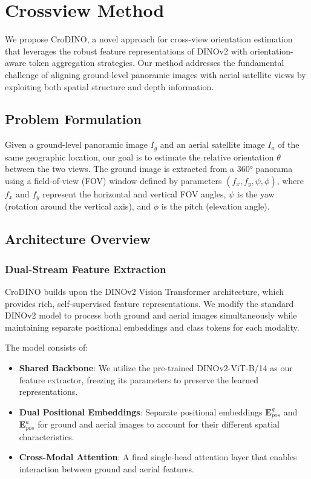 \section{Crossview Method}
\label{sec:method}

We propose CroDINO, a novel approach for cross-view orientation estimation that leverages the robust feature representations of DINOv2 with orientation-aware token aggregation strategies. Our method addresses the fundamental challenge of aligning ground-level panoramic images with aerial satellite views by exploiting both spatial structure and depth information.

\subsection{Problem Formulation}

Given a ground-level panoramic image $I_g$ and an aerial satellite image $I_a$ of the same geographic location, our goal is to estimate the relative orientation $\theta$ between the two views. The ground image is extracted from a 360° panorama using a field-of-view (FOV) window defined by parameters $(f_x, f_y, \psi, \phi)$, where $f_x$ and $f_y$ represent the horizontal and vertical FOV angles, $\psi$ is the yaw (rotation around the vertical axis), and $\phi$ is the pitch (elevation angle).

\subsection{Architecture Overview}

\subsubsection{Dual-Stream Feature Extraction}

CroDINO builds upon the DINOv2 Vision Transformer architecture, which provides rich, self-supervised feature representations. We modify the standard DINOv2 model to process both ground and aerial images simultaneously while maintaining separate positional embeddings and class tokens for each modality.

The model consists of:
\begin{itemize}
    \item \textbf{Shared Backbone}: We utilize the pre-trained DINOv2-ViT-B/14 as our feature extractor, freezing its parameters to preserve the learned representations.
    \item \textbf{Dual Positional Embeddings}: Separate positional embeddings $\mathbf{E}_{pos}^g$ and $\mathbf{E}_{pos}^a$ for ground and aerial images to account for their different spatial characteristics.
    \item \textbf{Cross-Modal Attention}: A final single-head attention layer that enables interaction between ground and aerial features.
\end{itemize}

